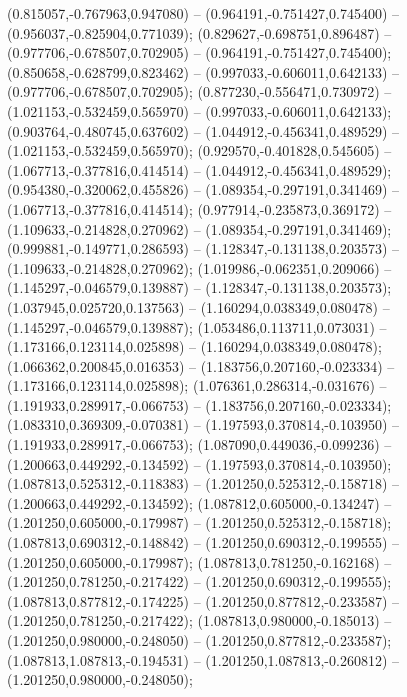  (0.815057,-0.767963,0.947080) -- (0.964191,-0.751427,0.745400) -- (0.956037,-0.825904,0.771039);
 (0.829627,-0.698751,0.896487) -- (0.977706,-0.678507,0.702905) -- (0.964191,-0.751427,0.745400);
 (0.850658,-0.628799,0.823462) -- (0.997033,-0.606011,0.642133) -- (0.977706,-0.678507,0.702905);
 (0.877230,-0.556471,0.730972) -- (1.021153,-0.532459,0.565970) -- (0.997033,-0.606011,0.642133);
 (0.903764,-0.480745,0.637602) -- (1.044912,-0.456341,0.489529) -- (1.021153,-0.532459,0.565970);
 (0.929570,-0.401828,0.545605) -- (1.067713,-0.377816,0.414514) -- (1.044912,-0.456341,0.489529);
 (0.954380,-0.320062,0.455826) -- (1.089354,-0.297191,0.341469) -- (1.067713,-0.377816,0.414514);
 (0.977914,-0.235873,0.369172) -- (1.109633,-0.214828,0.270962) -- (1.089354,-0.297191,0.341469);
 (0.999881,-0.149771,0.286593) -- (1.128347,-0.131138,0.203573) -- (1.109633,-0.214828,0.270962);
 (1.019986,-0.062351,0.209066) -- (1.145297,-0.046579,0.139887) -- (1.128347,-0.131138,0.203573);
 (1.037945,0.025720,0.137563) -- (1.160294,0.038349,0.080478) -- (1.145297,-0.046579,0.139887);
 (1.053486,0.113711,0.073031) -- (1.173166,0.123114,0.025898) -- (1.160294,0.038349,0.080478);
 (1.066362,0.200845,0.016353) -- (1.183756,0.207160,-0.023334) -- (1.173166,0.123114,0.025898);
 (1.076361,0.286314,-0.031676) -- (1.191933,0.289917,-0.066753) -- (1.183756,0.207160,-0.023334);
 (1.083310,0.369309,-0.070381) -- (1.197593,0.370814,-0.103950) -- (1.191933,0.289917,-0.066753);
 (1.087090,0.449036,-0.099236) -- (1.200663,0.449292,-0.134592) -- (1.197593,0.370814,-0.103950);
 (1.087813,0.525312,-0.118383) -- (1.201250,0.525312,-0.158718) -- (1.200663,0.449292,-0.134592);
 (1.087812,0.605000,-0.134247) -- (1.201250,0.605000,-0.179987) -- (1.201250,0.525312,-0.158718);
 (1.087813,0.690312,-0.148842) -- (1.201250,0.690312,-0.199555) -- (1.201250,0.605000,-0.179987);
 (1.087813,0.781250,-0.162168) -- (1.201250,0.781250,-0.217422) -- (1.201250,0.690312,-0.199555);
 (1.087813,0.877812,-0.174225) -- (1.201250,0.877812,-0.233587) -- (1.201250,0.781250,-0.217422);
 (1.087813,0.980000,-0.185013) -- (1.201250,0.980000,-0.248050) -- (1.201250,0.877812,-0.233587);
 (1.087813,1.087813,-0.194531) -- (1.201250,1.087813,-0.260812) -- (1.201250,0.980000,-0.248050);
